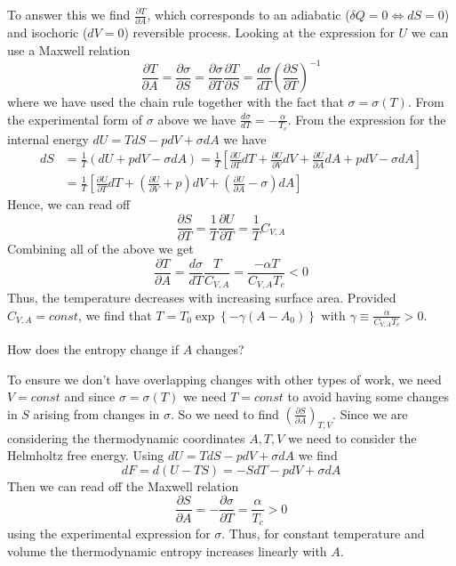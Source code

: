 \documentclass[12pt, a4paper, oneside, openright, titlepage]{book}
\begin{document}
To answer this we find $\frac{\partial T}{\partial A}$, which corresponds to an adiabatic ($\delta Q = 0 \iff dS = 0$) and isochoric ($dV = 0$) reversible process. Looking at the expression for $U$ we can use a Maxwell relation \begin{equation*}
    \frac{\partial T}{\partial A} = \frac{\partial \sigma}{\partial S} = \frac{\partial \sigma}{\partial T}\frac{\partial T}{\partial S} = \frac{d\sigma}{dT}\left(\frac{\partial S}{\partial T}\right)^{-1}
\end{equation*}
where we have used the chain rule together with the fact that $\sigma = \sigma(T)$. From the experimental form of $\sigma$ above we have $\frac{d\sigma}{dT} = -\frac{\alpha}{T_c}$. From the expression for the internal energy $dU = TdS - pdV + \sigma dA$ we have \begin{align*}
    dS &= \frac{1}{T}(dU+pdV-\sigma dA) = \frac{1}{T}\left[\frac{\partial U}{\partial T}dT + \frac{\partial U}{\partial V}dV + \frac{\partial U}{\partial A}dA + pdV - \sigma dA\right] \\
    &= \frac{1}{T}\left[\frac{\partial U}{\partial T}dT + \left(\frac{\partial U}{\partial V}+p\right)dV + \left(\frac{\partial U}{\partial A}-\sigma\right)dA\right] 
\end{align*}
Hence, we can read off \begin{equation*}
    \frac{\partial S}{\partial T} = \frac{1}{T}\frac{\partial U}{\partial T} = \frac{1}{T}C_{V,A}
\end{equation*}
Combining all of the above we get \begin{equation*}
    \frac{\partial T}{\partial A} = \frac{d\sigma}{dT} \frac{T}{C_{V,A}} = \frac{-\alpha T}{C_{V,A}T_c} < 0
\end{equation*}
Thus, the temperature decreases with increasing surface area. Provided $C_{V,A} = const$, we find that $T = T_0\exp\left\{-\gamma(A-A_0)\right\}$ with $\gamma \equiv \frac{\alpha}{C_{V,A}T_c} > 0$.

\begin{qst}
    How does the entropy change if $A$ changes?
\end{qst}

To ensure we don't have overlapping changes with other types of work, we need $V = const$ and since $\sigma = \sigma(T)$ we need $T = const$ to avoid having some changes in $S$ arising from changes in $\sigma$. So we need to find $\left(\frac{\partial S}{\partial A}\right)_{T,V}$. Since we are considering the thermodynamic coordinates $A,T,V$ we need to consider the Helmholtz free energy. Using $dU = TdS - pdV +\sigma dA$ we find \begin{equation*}
    dF = d(U-TS) = -SdT-pdV+\sigma dA
\end{equation*}
Then we can read off the Maxwell relation \begin{equation*}
    \frac{\partial S}{\partial A} = -\frac{\partial \sigma}{\partial T} = \frac{\alpha}{T_c} > 0
\end{equation*}
using the experimental expression for $\sigma$. Thus, for constant temperature and volume the thermodynamic entropy increases linearly with $A$.
\end{document}
